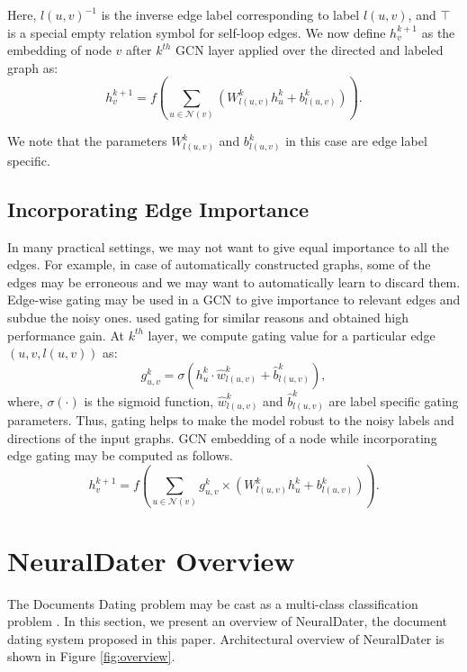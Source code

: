 \documentclass[11pt,a4paper]{article}
\newcommand{\reffig}[1]{Figure \ref{#1}}
\newcommand{\m}[1]{\mathcal{#1}}
\newcommand{\method}{NeuralDater}
\begin{document}
Here, $l(u,v)^{-1}$ is the inverse edge label corresponding to label $l(u,v)$, and $\top$ is a special empty relation symbol for self-loop edges. We now define $h_{v}^{k+1}$ as the embedding of node $v$ after $k^{th}$ GCN layer applied over the directed and labeled graph as:
\begin{equation}
h_{v}^{k+1} = f \left(\sum_{u \in \m{N}(v)}\left(W^{k}_{l(u,v)}h_{u}^{k} + b^{k}_{l(u,v)}\right)\right).
\label{eqn:gcn_diretected}
\end{equation}

We note that the parameters $W^{k}_{l(u,v)}$ and $b^{k}_{l(u,v)}$ in this case are edge label specific.

\subsection{Incorporating Edge Importance}
\label{sec:gating}

In many practical settings, we may not want to give equal importance to all the edges. For example, in case of automatically constructed graphs, some of the edges may be erroneous and we may want to automatically learn to discard them. Edge-wise gating may be used in a GCN to give importance to relevant edges and subdue the noisy ones. \citet{gcn_event, gcn_srl} used gating for similar reasons and obtained high performance gain. At $k^{th}$ layer, we compute gating value for a particular edge $(u,v, l(u,v))$ as:
\[
g^{k}_{u,v} = \sigma \left( h^{k}_u \cdot \hat{w}^{k}_{l(u,v)} + \hat{b}^{k}_{l(u,v)} \right),
\]
where, $\sigma(\cdot)$ is the sigmoid function, $\hat{w}^{k}_{l(u,v)}$ and $ \hat{b}^{k}_{l(u,v)}$ are label specific gating parameters. Thus, gating helps to make the model robust to the noisy labels and directions of the input graphs. GCN embedding of a node while incorporating edge gating may be computed as follows.
\[
h^{k+1}_{v} = f\left(\sum_{u \in \m{N}(v)} g^{k}_{u,v} \times \left({W}^{k}_{l(u,v)} h^{k}_{u} + b^{k}_{l(u,v)}\right)\right).
\]






\section{\method{} Overview}
\label{sec:method}

The Documents Dating problem may be cast as a multi-class classification problem \cite{Kotsakos:2014:BAD:2600428.2609495,Chambers:2012:LDT:2390524.2390539}. In this section, we present an overview of \method{}, the document dating system proposed in this paper. Architectural overview of \method{} is shown in \reffig{fig:overview}.
\end{document}

